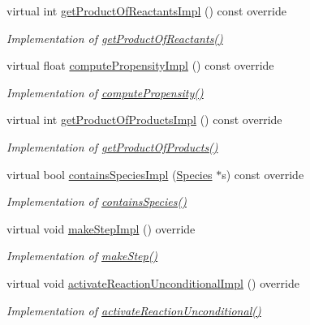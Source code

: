 \begin{DoxyCompactItemize}
virtual int \hyperlink{classchem_1_1Reaction_a764121bff008343f73d1bc701dafa9a6}{get\-Product\-Of\-Reactants\-Impl} () const override
\begin{DoxyCompactList}\small\item\em Implementation of \hyperlink{classchem_1_1ReactionBase_a3a5f011161601e3501dd8752829b12f5}{get\-Product\-Of\-Reactants()} \end{DoxyCompactList}\item 
virtual float \hyperlink{classchem_1_1Reaction_a16c2e5ad0e01e34c5abb6baf7d389841}{compute\-Propensity\-Impl} () const override
\begin{DoxyCompactList}\small\item\em Implementation of \hyperlink{classchem_1_1ReactionBase_a3e91b5d0c44fcb81bb17d2d0fee7947d}{compute\-Propensity()} \end{DoxyCompactList}\item 
virtual int \hyperlink{classchem_1_1Reaction_a1be37929622322dde8fc0efbee50fb36}{get\-Product\-Of\-Products\-Impl} () const override
\begin{DoxyCompactList}\small\item\em Implementation of \hyperlink{classchem_1_1ReactionBase_ab8da881092b40a3c3c4f724fa23f7422}{get\-Product\-Of\-Products()} \end{DoxyCompactList}\item 
virtual bool \hyperlink{classchem_1_1Reaction_a1add1afc001452533140c0130ff0e2e3}{contains\-Species\-Impl} (\hyperlink{classchem_1_1Species}{Species} $\ast$s) const override
\begin{DoxyCompactList}\small\item\em Implementation of \hyperlink{classchem_1_1ReactionBase_a35e914ed47c4107c86ef18f0f8ddb9e6}{contains\-Species()} \end{DoxyCompactList}\item 
virtual void \hyperlink{classchem_1_1Reaction_ad7aee2091f1da5b1988605b084f6640a}{make\-Step\-Impl} () override
\begin{DoxyCompactList}\small\item\em Implementation of \hyperlink{classchem_1_1ReactionBase_acb5575b08ca39fc6dd7a571fb246806b}{make\-Step()} \end{DoxyCompactList}\item 
virtual void \hyperlink{classchem_1_1Reaction_a9ce9262242def224e7ed3878e836a5ac}{activate\-Reaction\-Unconditional\-Impl} () override
\begin{DoxyCompactList}\small\item\em Implementation of \hyperlink{classchem_1_1ReactionBase_a8eb302e62acd94d58f4b8a1301d83a5e}{activate\-Reaction\-Unconditional()} \end{DoxyCompactList}\item 

\end{DoxyCompactItemize}
